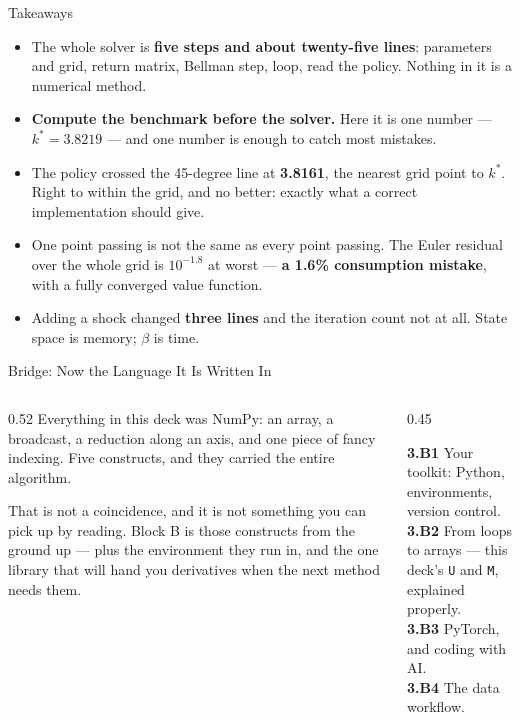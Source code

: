 \begin{frame}{Takeaways}
\begin{takeawaybox}
\begin{itemize}\small
  \item The whole solver is \textbf{five steps and about twenty-five lines}: parameters and grid, return matrix, Bellman step, loop, read the policy. Nothing in it is a numerical method.
  \item \textbf{Compute the benchmark before the solver.} Here it is one number --- $k^{*}=3.8219$ --- and one number is enough to catch most mistakes.
  \item The policy crossed the 45-degree line at \textbf{3.8161}, the nearest grid point to $k^{*}$. Right to within the grid, and no better: exactly what a correct implementation should give.
  \item One point passing is not the same as every point passing. The Euler residual over the whole grid is $10^{-1.8}$ at worst --- \textbf{a 1.6\% consumption mistake}, with a fully converged value function.
  \item Adding a shock changed \textbf{three lines} and the iteration count not at all. State space is memory; $\beta$ is time.
\end{itemize}
\end{takeawaybox}
\end{frame}

\begin{frame}{Bridge: Now the Language It Is Written In}
\begin{columns}[T]
\begin{column}{0.52\textwidth}
\small
Everything in this deck was NumPy: an array, a broadcast, a reduction along an axis, and one piece of fancy indexing. Five constructs, and they carried the entire algorithm.
\medskip

That is not a coincidence, and it is not something you can pick up by reading. Block B is those constructs from the ground up --- plus the environment they run in, and the one library that will hand you derivatives when the next method needs them.
\end{column}
\begin{column}{0.45\textwidth}
\begin{conceptbox}[title=\textbf{After the break (Block B)}]\small
\textbf{3.B1} Your toolkit: Python, environments, version control.\\[1mm]
\textbf{3.B2} From loops to arrays --- this deck's \texttt{U} and \texttt{M}, explained properly.\\[1mm]
\textbf{3.B3} PyTorch, and coding with AI.\\[1mm]
\textbf{3.B4} The data workflow.
\end{conceptbox}
\end{column}
\end{columns}
\end{frame}


